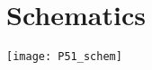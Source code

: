 \chapter{Schematics}\label{ch:appAlabel}

\begin{sidewaysfigure}
     \texttt{[image: P51\_schem]}
\end{sidewaysfigure}

